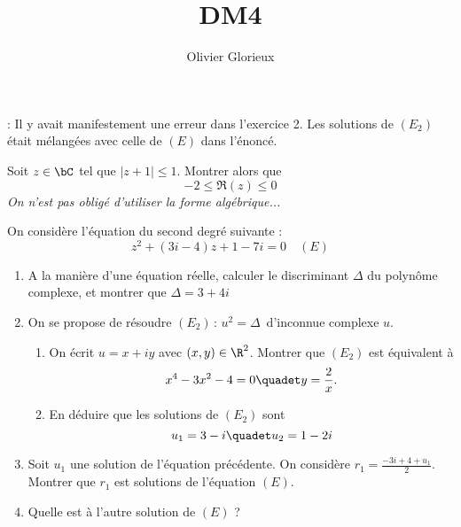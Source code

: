 \documentclass[a4paper, 11pt,reqno]{article}
\author{Olivier Glorieux}
\begin{document}
\title{DM4 
}

\warning : Il y avait manifestement une erreur dans l'exercice 2. Les solutions de $(E_2)$ était mélangées avec celle de $(E)$ dans l'énoncé.

\begin{exercice}
Soit $z\in \bC$ tel que $|z+1| \leq 1$. Montrer alors que 
$$-2\leq \Re(z)\leq 0$$
\footnotesize{ \textit{On n'est pas obligé d'utiliser la forme algébrique...} }

\end{exercice}

%
%
%
%


\begin{exercice}
On considère l'équation du second degré suivante : 
$$z^2+(3i-4)z+1-7i=0 \quad (E) $$

\begin{enumerate}
\item A la manière d'une équation réelle, calculer le discriminant $\Delta$ du polynôme complexe, et montrer que $\Delta=3+4i$
\item On se propose de résoudre $ (E_2) \, : \, u^2=\Delta \, $  d'inconnue complexe $u$. 
\begin{enumerate}
\item On écrit $u=x+iy$ avec $(x,y)\in \R^2$. Montrer que $(E_2)$ est équivalent à 
$$ x^4-3x^2-4=0 \quadet y =\frac{2}{x}.$$
\item En déduire que les solutions de $(E_2)$ sont 
$$u_1=3-i\quadet u_2=1-2i$$
\end{enumerate}
\item Soit $u_1$ une solution de l'équation précédente. 
On considère $r_1 = \frac{-3i+4 +u_1}{2}$. Montrer que $r_1$ est solutions de l'équation  $(E)$.
\item Quelle est à l'autre solution  de  $(E)$ ? 
\end{enumerate}

\end{exercice}
\end{document}
